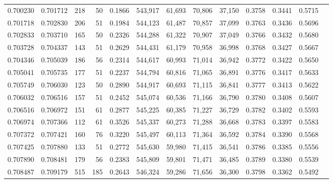 \begin{tabular}{rrrrrrrrrrrrr}
0.700230 & 0.701712 &   218 &  50 &                                     0.1866 & 543,917 &  61,693 &  70,806 &  37,150 & 0.3758 & 0.3441 & 0.5715 \\
0.701718 & 0.702830 &   206 &  51 &                                     0.1984 & 544,123 &  61,487 &  70,857 &  37,099 & 0.3763 & 0.3436 & 0.5696 \\
0.702833 & 0.703710 &   165 &  50 &                                     0.2326 & 544,288 &  61,322 &  70,907 &  37,049 & 0.3766 & 0.3432 & 0.5680 \\
0.703728 & 0.704337 &   143 &  51 &                                     0.2629 & 544,431 &  61,179 &  70,958 &  36,998 & 0.3768 & 0.3427 & 0.5667 \\
0.704346 & 0.705039 &   186 &  56 &                                     0.2314 & 544,617 &  60,993 &  71,014 &  36,942 & 0.3772 & 0.3422 & 0.5650 \\
0.705041 & 0.705735 &   177 &  51 &                                     0.2237 & 544,794 &  60,816 &  71,065 &  36,891 & 0.3776 & 0.3417 & 0.5633 \\
0.705749 & 0.706030 &   123 &  50 &                                     0.2890 & 544,917 &  60,693 &  71,115 &  36,841 & 0.3777 & 0.3413 & 0.5622 \\
0.706032 & 0.706516 &   157 &  51 &                                     0.2452 & 545,074 &  60,536 &  71,166 &  36,790 & 0.3780 & 0.3408 & 0.5607 \\
0.706516 & 0.706972 &   151 &  61 &                                     0.2877 & 545,225 &  60,385 &  71,227 &  36,729 & 0.3782 & 0.3402 & 0.5593 \\
0.706974 & 0.707366 &   112 &  61 &                                     0.3526 & 545,337 &  60,273 &  71,288 &  36,668 & 0.3783 & 0.3397 & 0.5583 \\
0.707372 & 0.707421 &   160 &  76 &                                     0.3220 & 545,497 &  60,113 &  71,364 &  36,592 & 0.3784 & 0.3390 & 0.5568 \\
0.707425 & 0.707880 &   133 &  51 &                                     0.2772 & 545,630 &  59,980 &  71,415 &  36,541 & 0.3786 & 0.3385 & 0.5556 \\
0.707890 & 0.708481 &   179 &  56 &                                     0.2383 & 545,809 &  59,801 &  71,471 &  36,485 & 0.3789 & 0.3380 & 0.5539 \\
0.708487 & 0.709179 &   515 & 185 &                                     0.2643 & 546,324 &  59,286 &  71,656 &  36,300 & 0.3798 & 0.3362 & 0.5492 \\

\end{tabular}
